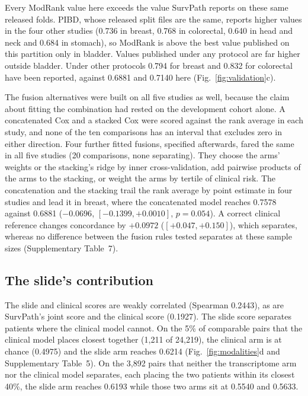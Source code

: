\documentclass[pdflatex,sn-nature]{sn-jnl}
\begin{document}
Every ModRank value here exceeds the value SurvPath reports on these same released folds. PIBD, whose released split files
are the same, reports higher values in the four other studies (0.736 in breast, 0.768 in colorectal,
0.640 in head and neck and 0.684 in stomach), so ModRank is above the best value published on this
partition only in bladder. Values published under any protocol are far higher
outside bladder. Under other protocols 0.794 for breast and 0.832 for colorectal have
been reported, against 0.6881 and 0.7140 here (Fig.~\ref{fig:validation}c).

The fusion alternatives were built on all five studies as well, because the claim about fitting the
combination had rested on the development cohort alone. A concatenated Cox and a stacked Cox
were scored against the rank average in each study, and none of the ten comparisons has an interval
that excludes zero in either direction. Four further fitted fusions, specified afterwards, fared the
same in all five studies (20 comparisons, none separating). They choose the arms' weights or the
stacking's ridge by inner cross-validation, add pairwise products of the arms to the stacking, or
weight the arms by tertile of clinical risk. The concatenation and the stacking trail the rank average by point estimate in
four studies and lead it in breast, where the concatenated model reaches 0.7578 against 0.6881
($-0.0696$, $[-0.1399, +0.0010]$, $p=0.054$). A correct clinical reference changes
concordance by $+0.0972$ ($[+0.047, +0.150]$), which separates, whereas no difference between the
fusion rules tested separates at these sample sizes (Supplementary Table~7).

\subsection*{The slide's contribution}

The slide and clinical scores are weakly correlated (Spearman 0.2443), as are SurvPath's joint
score and the clinical score (0.1927). The slide score separates patients where the clinical model
cannot. On the 5\% of comparable pairs that the
clinical model places closest together (1,211 of 24,219), the clinical arm is at chance (0.4975) and
the slide arm reaches 0.6214 (Fig.~\ref{fig:modalities}d and Supplementary Table~5). On the 3,892
pairs that neither the
transcriptome arm nor the clinical model separates, each placing the two patients within its closest
40\%, the slide arm reaches 0.6193 while those two arms sit at 0.5540 and 0.5633.
\end{document}
